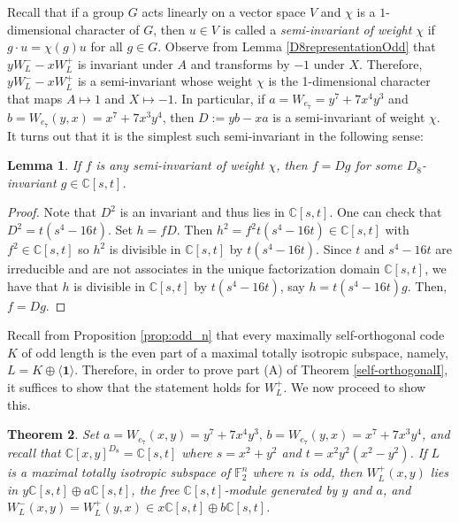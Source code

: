 \documentclass[a4paper,reqno]{amsart}
\newcommand{\bydef}{:=}
\newcommand{\buno}{\mathbf{1}}
\newcommand{\FF}{\mathbb{F}}
\newtheorem{theorem}{Theorem}[section]
\newtheorem{lemma}[theorem]{Lemma}
\theoremstyle{definition}
\theoremstyle{remark} \newtheorem{remark}[theorem]{Remark}
\numberwithin{equation}{section}
\begin{document}
Recall that if a group \(G\) acts linearly on a vector space \(V\) and \(\chi\) is a \(1\)-dimensional character of \(G\), then \(u \in V\) is called a \emph{semi-invariant of weight \(\chi\)} if \(g \cdot u = \chi(g)u\) for all \(g \in G\). Observe from Lemma \ref{D8representationOdd} that \(yW_L^- - xW_L^+\) is invariant under \(A\) and transforms by \(-1\) under \(X\). Therefore, \(yW_L^- - xW_L^+\) is a semi-invariant whose weight \(\chi\) is the 1-dimensional character that maps \(A \mapsto 1\) and \(X \mapsto -1\). In particular, if \(a = W_{e_7} = y^7 + 7x^4y^3\) and \(b = W_{e_7}(y,x) = x^7 + 7x^3y^4\), then \(D \bydef yb - xa\) is a semi-invariant of weight \(\chi\). It turns out that it is the simplest such semi-invariant in the following sense: 

\begin{lemma}\label{semi-invariantD}
    If \(f\) is any semi-invariant of weight \(\chi\), then \(f = Dg\) for some \(D_8\)-invariant \(g \in \mathbb{C}[s,t]\).
\end{lemma}

\begin{proof}
    Note that \(D^2\) is an invariant and thus lies in \(\mathbb{C}[s,t]\). One can check that \(D^2 = t(s^4 - 16t)\). Set \(h = fD\). Then \(h^2 = f^2t(s^4-16t) \in \mathbb{C}[s,t]\) with \(f^2 \in \mathbb{C}[s,t]\) so \(h^2\) is divisible in \(\mathbb{C}[s,t]\) by \(t(s^4-16t)\). Since \(t\) and \(s^4-16t\) are irreducible and are not associates in the unique factorization domain \(\mathbb{C}[s,t]\), we have that \(h\) is divisible in \(\mathbb{C}[s,t]\) by \(t(s^4-16t)\), say \(h = t(s^4-16t)g\). Then, \(f = Dg\).
\end{proof}

Recall from Proposition \ref{prop:odd_n} that every maximally self-orthogonal code $K$ of odd length is the even part of a maximal totally isotropic subspace, namely, $L=K\oplus\langle\buno\rangle$. Therefore, in order to prove part (A) of Theorem \ref{self-orthogonalI}, it suffices to show that the statement holds for \(W_L^+\). We now proceed to show this. 

\begin{theorem}\label{ClassicalThmI}
    Set \(a = W_{e_7}(x,y) = y^7 + 7x^4y^3,\, b = W_{e_7}(y,x) = x^7 + 7x^3y^4\), and recall that \(\mathbb{C}[x,y]^{D_8} = \mathbb{C}[s,t]\) where \(s = x^2+y^2\) and \(t = x^2y^2(x^2-y^2)\). If $L$ is a maximal totally isotropic subspace of $\FF_2^n$ where \(n\) is odd, then \(W_L^+(x,y)\) lies in \(y\mathbb{C}[s,t] \oplus a\mathbb{C}[s,t]\), the free \(\mathbb{C}[s,t]\)-module generated by \(y\) and \(a\), and \(W^-_L(x,y)=W^+_L(y,x)\in x\mathbb{C}[s,t] \oplus b\mathbb{C}[s,t]\).
\end{theorem}
\end{document}
